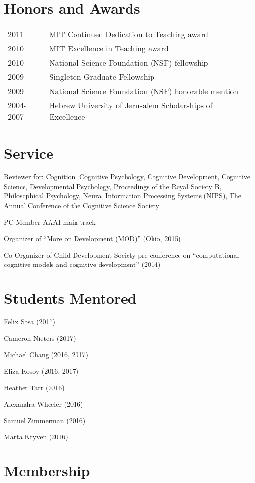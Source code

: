 \documentclass[margin,line,pifont,palatino,courier]{res}
\begin{document}
\begin{resume}
\section{\sc Honors and Awards}

\begin{tabular}{@{}p{0.8in}p{4in}}
2011 & MIT Continued Dedication to Teaching award  \\
2010 & MIT Excellence in Teaching award  \\
2010 & National Science Foundation (NSF) fellowship\\
2009 & Singleton Graduate Fellowship \\
2009 & National Science Foundation (NSF) honorable mention\\
2004-2007 & Hebrew University of Jerusalem Scholarships of Excellence
\end{tabular}


\section{\sc Service}

Reviewer for: Cognition, Cognitive Psychology, Cognitive Development, Cognitive Science, Developmental Psychology, Proceedings of the Royal Society B, Philosophical Psychology, Neural Information Processing Systems (NIPS), The Annual Conference of the Cognitive Science Society

PC Member AAAI main track

Organizer of ``More on Development (MOD)'' (Ohio, 2015)

Co-Organizer of Child Development Society pre-conference on ``computational cognitive models and cognitive development'' (2014)

\section{\sc Students Mentored}

Felix Sosa (2017)

Cameron Nieters (2017)

Michael Chang (2016, 2017)

Eliza Kosoy (2016, 2017)

Heather Tarr (2016)

Alexandra Wheeler (2016)

Samuel Zimmerman (2016)

Marta Kryven (2016)


\section{\sc Membership}


\end{resume}
\end{document}
